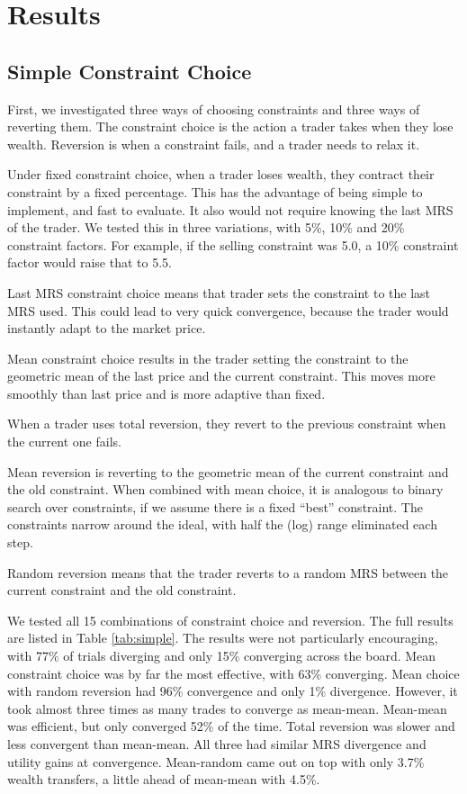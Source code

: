\documentclass[12pt,a4paper,titlepage]{article}
\begin{document}
\section{Results}\label{results}
\subsection{Simple Constraint Choice}
First, we investigated three ways of choosing constraints and three ways of reverting them.
The constraint choice is the action a trader takes when they lose wealth.
Reversion is when a constraint fails, and a trader needs to relax it.

Under fixed constraint choice, when a trader loses wealth, they contract their constraint by a fixed percentage.
This has the advantage of being simple to implement, and fast to evaluate.
It also would not require knowing the last MRS of the trader.
We tested this in three variations, with 5\%, 10\% and 20\% constraint factors.
For example, if the selling constraint was 5.0, a 10\% constraint factor would raise that to 5.5.
    
Last MRS constraint choice means that trader sets the constraint to the last MRS used.
This could lead to very quick convergence, because the trader would instantly adapt to the market price.

Mean constraint choice results in the trader setting the constraint to the geometric mean of the last price and the current constraint.
This moves more smoothly than last price and is more adaptive than fixed.

When a trader uses total reversion, they revert to the previous constraint when the current one fails.

Mean reversion is reverting to the geometric mean of the current constraint and the old constraint.
When combined with mean choice, it is analogous to binary search over constraints, if we assume there is a fixed ``best'' constraint.
The constraints narrow around the ideal, with half the (log) range eliminated each step.

Random reversion means that the trader reverts to a random MRS between the current constraint and the old constraint.

We tested all 15 combinations of constraint choice and reversion.
The full results are listed in Table \ref{tab:simple}.
The results were not particularly encouraging, with 77\% of trials diverging and only 15\% converging across the board.
Mean constraint choice was by far the most effective, with 63\% converging.
Mean choice with random reversion had 96\% convergence and only 1\% divergence.
However, it took almost three times as many trades to converge as mean-mean.
Mean-mean was efficient, but only converged 52\% of the time.
Total reversion was slower and less convergent than mean-mean.
All three had similar MRS divergence and utility gains at convergence.
Mean-random came out on top with only 3.7\% wealth transfers, a little ahead of mean-mean with 4.5\%.
\end{document}
